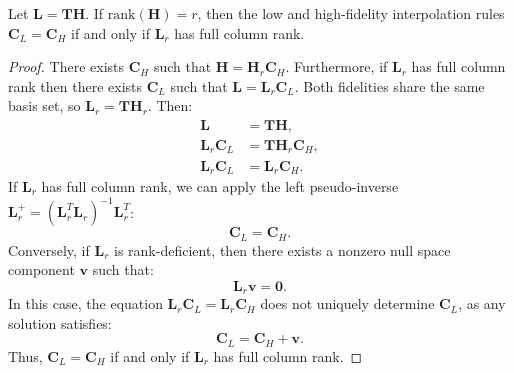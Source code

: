 \documentclass[10pt,a4paper]{amsart}
\begin{document}
\begin{proposition}
    Let $\bm{L} = \bm{T} \bm{H}$. If  $\mathrm{rank}(\bm{H})=r$, then the low and high-fidelity interpolation rules $\bm{C}_L = \bm{C}_H$ if and only if $\bm{L}_r$ has full column rank.
\end{proposition}

\begin{proof}
    There exists $\bm{C}_H$ such that $\bm{H} = \bm{H}_r \bm{C}_H $. Furthermore, if $\bm{L}_r$ has full column rank then there exists $\bm{C}_L$ such that $ \bm{L} = \bm{L}_r \bm{C}_L $.
    Both fidelities share the same basis set, so $\bm{L}_r=\bm{T}\bm{H}_r$. Then:
    \begin{align*}
    \bm{L} &= \bm{T} \bm{H}, \\
        \bm{L}_r \bm{C}_L &= \bm{T} \bm{H}_r \bm{C}_H, \\
    \bm{L}_r \bm{C}_L &= \bm{L}_r \bm{C}_H.
    \end{align*}
    If $\bm{L}_r$ has full column rank, we can apply the left pseudo-inverse $\bm{L}_r^+ = (\bm{L}_r^T \bm{L}_r)^{-1} \bm{L}_r^T$:
    \begin{equation}
        \bm{C}_L = \bm{C}_H.
    \end{equation}
    Conversely, if $\bm{L}_r$ is rank-deficient, then there exists a nonzero null space component $\bm{v}$ such that:
    \begin{equation}
        \bm{L}_r \bm{v} = \bm{0}.
    \end{equation}
    In this case, the equation $\bm{L}_r \bm{C}_L = \bm{L}_r \bm{C}_H$ does not uniquely determine $\bm{C}_L$, as any solution satisfies:
    \begin{equation}
        \bm{C}_L = \bm{C}_H + \bm{v}.
    \end{equation}
    Thus, $\bm{C}_L = \bm{C}_H$ if and only if $\bm{L}_r$ has full column rank.
\end{proof}
\end{document}
